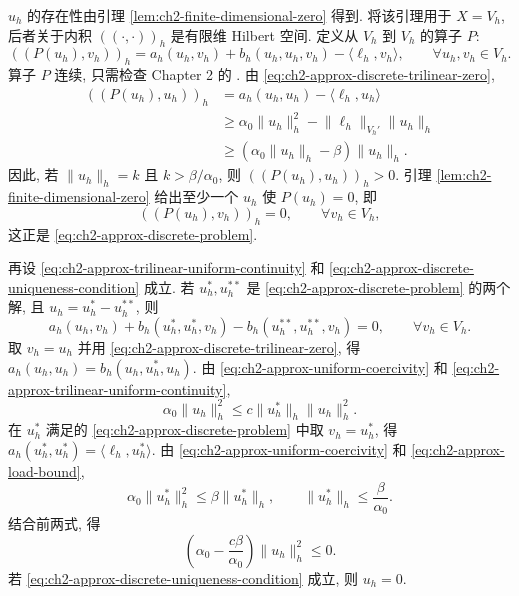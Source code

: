\begin{Proof}
$u_h$ 的存在性由引理 \ref{lem:ch2-finite-dimensional-zero} 得到. 将该引理用于 $X=V_h$, 后者关于内积 $((\cdot,\cdot))_h$ 是有限维 Hilbert 空间. 定义从 $V_h$ 到 $V_h$ 的算子 $P$:
\begin{equation}
((P(u_h),v_h))_h
=a_h(u_h,v_h)+b_h(u_h,u_h,v_h)-\langle\ell_h,v_h\rangle,
\qquad\forall u_h,v_h\in V_h.
\label{eq:ch2-approx-discrete-operator}
\end{equation}
算子 $P$ 连续, 只需检查 Chapter 2 的 . 由 \eqref{eq:ch2-approx-discrete-trilinear-zero},
\[
\begin{aligned}
((P(u_h),u_h))_h
&=a_h(u_h,u_h)-\langle\ell_h,u_h\rangle\\
&\geq\alpha_0\lVert u_h\rVert_h^2-\lVert\ell_h\rVert_{V_h'}\lVert u_h\rVert_h\\
&\geq(\alpha_0\lVert u_h\rVert_h-\beta)\lVert u_h\rVert_h.
\end{aligned}
\]
因此, 若 $\lVert u_h\rVert_h=k$ 且 $k>\beta/\alpha_0$, 则 $((P(u_h),u_h))_h>0$. 引理 \ref{lem:ch2-finite-dimensional-zero} 给出至少一个 $u_h$ 使 $P(u_h)=0$, 即
\begin{equation}
((P(u_h),v_h))_h=0,
\qquad\forall v_h\in V_h,
\label{eq:ch2-approx-discrete-operator-zero}
\end{equation}
这正是 \eqref{eq:ch2-approx-discrete-problem}.

\hypertarget{chapter-02-page-151}{}
再设 \eqref{eq:ch2-approx-trilinear-uniform-continuity} 和 \eqref{eq:ch2-approx-discrete-uniqueness-condition} 成立. 若 $u_h^*,u_h^{**}$ 是 \eqref{eq:ch2-approx-discrete-problem} 的两个解, 且 $u_h=u_h^*-u_h^{**}$, 则
\[
a_h(u_h,v_h)+b_h(u_h^*,u_h^*,v_h)-b_h(u_h^{**},u_h^{**},v_h)=0,
\qquad\forall v_h\in V_h.
\]
取 $v_h=u_h$ 并用 \eqref{eq:ch2-approx-discrete-trilinear-zero}, 得 $a_h(u_h,u_h)=b_h(u_h,u_h^*,u_h)$. 由 \eqref{eq:ch2-approx-uniform-coercivity} 和 \eqref{eq:ch2-approx-trilinear-uniform-continuity},
\begin{equation}
\alpha_0\lVert u_h\rVert_h^2
\leq c\lVert u_h^*\rVert_h\lVert u_h\rVert_h^2.
\label{eq:ch2-approx-uniqueness-difference-bound}
\end{equation}
在 $u_h^*$ 满足的 \eqref{eq:ch2-approx-discrete-problem} 中取 $v_h=u_h^*$, 得 $a_h(u_h^*,u_h^*)=\langle\ell_h,u_h^*\rangle$. 由 \eqref{eq:ch2-approx-uniform-coercivity} 和 \eqref{eq:ch2-approx-load-bound},
\begin{equation}
\alpha_0\lVert u_h^*\rVert_h^2\leq\beta\lVert u_h^*\rVert_h,
\qquad
\lVert u_h^*\rVert_h\leq\frac\beta{\alpha_0}.
\label{eq:ch2-approx-solution-apriori-bound}
\end{equation}
结合前两式, 得
\begin{equation}
\left(\alpha_0-\frac{c\beta}{\alpha_0}\right)\lVert u_h\rVert_h^2\leq0.
\label{eq:ch2-approx-uniqueness-final-bound}
\end{equation}
若 \eqref{eq:ch2-approx-discrete-uniqueness-condition} 成立, 则 $u_h=0$.
\end{Proof}

